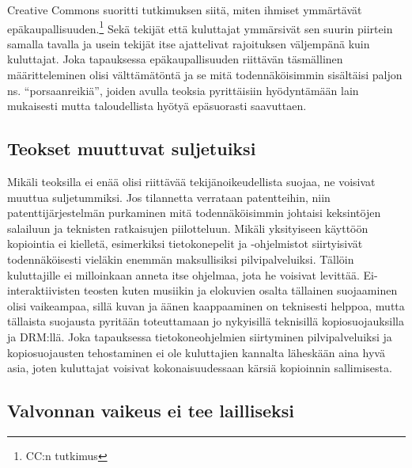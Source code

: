 \documentclass[titlepage,12pt]{article}
\begin{document}
Creative Commons suoritti tutkimuksen siitä, miten ihmiset ymmärtävät
epäkaupallisuuden.\footnote{CC:n tutkimus} Sekä tekijät että
kuluttajat ymmärsivät sen suurin piirtein samalla tavalla ja usein
tekijät itse ajattelivat rajoituksen väljempänä kuin kuluttajat.  Joka
tapauksessa epäkaupallisuuden riittävän täsmällinen määritteleminen
olisi välttämätöntä ja se mitä todennäköisimmin sisältäisi paljon
ns. ``porsaanreikiä'', joiden avulla teoksia pyrittäisiin hyödyntämään
lain mukaisesti mutta taloudellista hyötyä epäsuorasti saavuttaen.






\subsection{Teokset muuttuvat suljetuiksi}

Mikäli teoksilla ei enää olisi riittävää tekijänoikeudellista suojaa,
ne voisivat muuttua suljetummiksi.  Jos tilannetta verrataan
patentteihin, niin patenttijärjestelmän purkaminen mitä
todennäköisimmin johtaisi keksintöjen salailuun ja teknisten
ratkaisujen piilotteluun.  Mikäli yksityiseen käyttöön kopiointia ei
kielletä, esimerkiksi tietokonepelit ja -ohjelmistot siirtyisivät
todennäköisesti vieläkin enemmän maksullisiksi pilvipalveluiksi.
Tällöin kuluttajille ei milloinkaan anneta itse ohjelmaa, jota he
voisivat levittää.  Ei-interaktiivisten teosten kuten musiikin ja
elokuvien osalta tällainen suojaaminen olisi vaikeampaa, sillä kuvan
ja äänen kaappaaminen on teknisesti helppoa, mutta tällaista suojausta
pyritään toteuttamaan jo nykyisillä teknisillä kopiosuojauksilla ja
DRM:llä.  Joka tapauksessa tietokoneohjelmien siirtyminen
pilvipalveluiksi ja kopiosuojausten tehostaminen ei ole kuluttajien
kannalta läheskään aina hyvä asia, joten kuluttajat voisivat
kokonaisuudessaan kärsiä kopioinnin sallimisesta.



\subsection{Valvonnan vaikeus ei tee lailliseksi}
\end{document}
